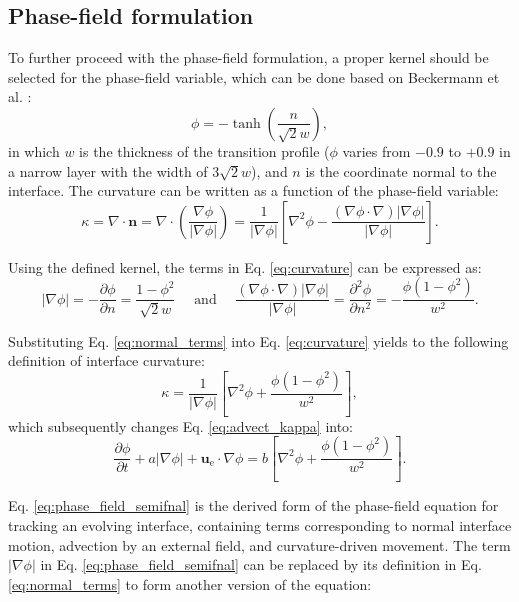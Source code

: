 \subsection{Phase-field formulation}

To further proceed with the phase-field formulation, a proper kernel should be selected for the phase-field variable, which can be done based on Beckermann et al. \cite{Beckermann1999}:
\begin{equation} \label{eq:kernel}
\phi=-\tanh \left(\frac{n}{\sqrt{2} w}\right),
\end{equation}
in which $w$ is the thickness of the transition profile ($\phi$ varies from $-0.9$ to $+0.9$ in a narrow layer with the width of $3 \sqrt{2} w$), and $n$ is the coordinate normal to the interface. The curvature can be written as a function of the phase-field variable:
\begin{equation}  \label{eq:curvature}
\kappa=\nabla \cdot \boldsymbol{n}=\nabla \cdot\left(\frac{\nabla \phi}{|\nabla \phi|}\right)=\frac{1}{|\nabla \phi|}\left[\nabla^{2} \phi-\frac{(\nabla \phi \cdot \nabla)|\nabla \phi|}{|\nabla \phi|}\right].
\end{equation}

Using the defined kernel, the terms in Eq. \ref{eq:curvature} can be expressed as:
\begin{equation} \label{eq:normal_terms}
|\nabla \phi|=-\frac{\partial \phi}{\partial n}=\frac{1-\phi^{2}}{\sqrt{2} w} \quad \text { and } \quad \frac{(\nabla \phi \cdot \nabla)|\nabla \phi|}{|\nabla \phi|}=\frac{\partial^{2} \phi}{\partial n^{2}}=-\frac{\phi\left(1-\phi^{2}\right)}{w^{2}}.
\end{equation}

Substituting Eq. \ref{eq:normal_terms} into Eq. \ref{eq:curvature} yields to the following definition of interface curvature:
\begin{equation}
\kappa=\frac{1}{|\nabla \phi|}\left[\nabla^{2} \phi+\frac{\phi\left(1-\phi^{2}\right)}{w^{2}}\right],
\end{equation}
which subsequently changes Eq. \ref{eq:advect_kappa} into:
\begin{equation} \label{eq:phase_field_semifnal}
\frac{\partial \phi}{\partial t}+a|\nabla \phi|+\boldsymbol{u}_{\mathrm{e}} \cdot \nabla \phi=b\left[\nabla^{2} \phi+\frac{\phi\left(1-\phi^{2}\right)}{w^{2}}\right].
\end{equation}

Eq. \ref{eq:phase_field_semifnal} is the derived form of the phase-field equation for tracking an evolving interface, containing terms corresponding to normal interface motion, advection by an external field, and curvature-driven movement. The term $|\nabla \phi|$ in Eq. \ref{eq:phase_field_semifnal} can be replaced by its definition in Eq. \ref{eq:normal_terms} to form another version of the equation:

